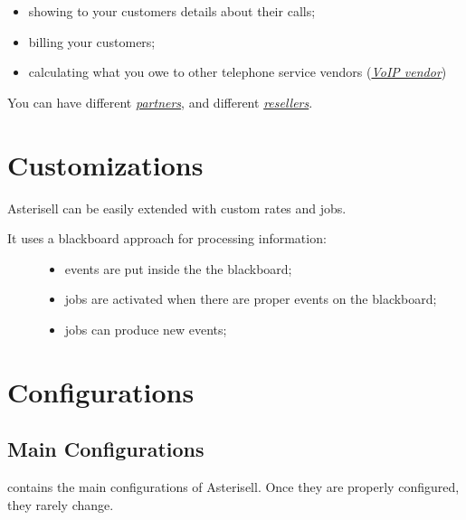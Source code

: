\documentclass[letterpaper,10pt,english]{sphinxmanual}
\begin{document}
\begin{description}
\begin{itemize}
\item {} 
showing to your customers details about their calls;

\item {} 
billing your customers;

\item {} 
calculating what you owe to other telephone service vendors ({\hyperref[index:term-voip-vendor]{\emph{VoIP vendor}}})

\end{itemize}

\end{description}

You can have different {\hyperref[index:term-partner]{\emph{partners}}}, and different {\hyperref[index:term-reseller]{\emph{resellers}}}.


\chapter{Customizations}
\label{index:asterisell-customizations}\label{index:customizations}
Asterisell can be easily extended with custom rates and jobs.
\begin{description}
\item[{It uses a blackboard approach for processing information:}] \leavevmode\begin{itemize}
\item {} 
events are put inside the the blackboard;

\item {} 
jobs are activated when there are proper events on the blackboard;

\item {} 
jobs can produce new events;

\end{itemize}

\end{description}


\chapter{Configurations}
\label{index:configurations}

\section{Main Configurations}
\label{index:main-configurations}\label{index:id1}
 contains the main configurations of Asterisell. Once they are properly configured, they rarely change.
\end{document}
